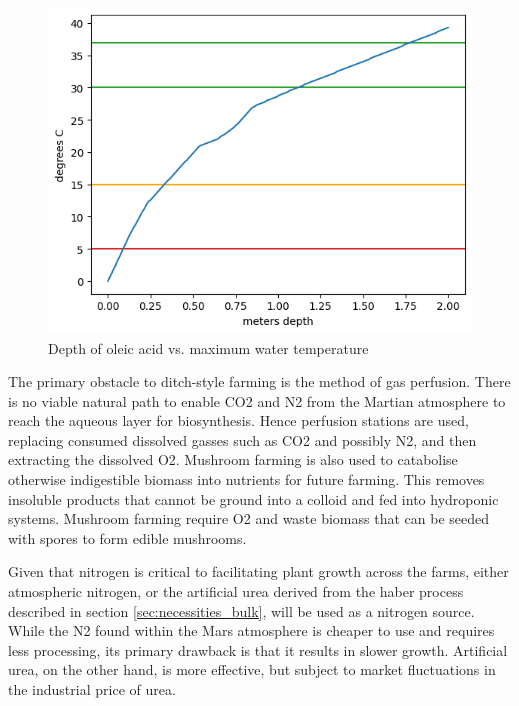 \documentclass[fleqn,10pt]{Stylesheet} %
\begin{document}
\begin{figure}
    \centering
    \includegraphics[width=\linewidth]{figures/fig_bp.png}
    \caption{Depth of oleic acid vs. maximum water temperature}
    \label{fig:oleic_acid_bp}
\end{figure}


The primary obstacle to ditch-style farming is the method of gas perfusion. There is no viable natural path to enable CO2 and N2 from the Martian atmosphere to reach the aqueous layer for biosynthesis. Hence perfusion stations are used, replacing consumed dissolved gasses such as CO2 and possibly N2, and then extracting the dissolved O2. Mushroom farming is also used to catabolise otherwise indigestible biomass into nutrients for future farming. This removes insoluble products that cannot be ground into a colloid and fed into hydroponic systems. Mushroom farming require O2 and waste biomass that can be seeded with spores to form edible mushrooms.

Given that nitrogen is critical to facilitating plant growth across the farms, either atmospheric nitrogen, or the artificial urea derived from the haber process described in section \ref{sec:necessities_bulk}, will be used as a nitrogen source. While the N2 found within the Mars atmosphere is cheaper to use and requires less processing, its primary drawback is that it results in slower growth. Artificial urea, on the other hand, is more effective, but subject to market fluctuations in the industrial price of urea.
\end{document}
